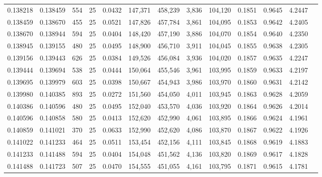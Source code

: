 \begin{tabular}{rrrrrrrrrrrrr}
0.138218 & 0.138459 &   554 &  25 &                                     0.0432 & 147,371 & 458,239 &   3,836 & 104,120 & 0.1851 & 0.9645 & 4.2447 \\
0.138459 & 0.138670 &   455 &  25 &                                     0.0521 & 147,826 & 457,784 &   3,861 & 104,095 & 0.1853 & 0.9642 & 4.2405 \\
0.138670 & 0.138944 &   594 &  25 &                                     0.0404 & 148,420 & 457,190 &   3,886 & 104,070 & 0.1854 & 0.9640 & 4.2350 \\
0.138945 & 0.139155 &   480 &  25 &                                     0.0495 & 148,900 & 456,710 &   3,911 & 104,045 & 0.1855 & 0.9638 & 4.2305 \\
0.139156 & 0.139443 &   626 &  25 &                                     0.0384 & 149,526 & 456,084 &   3,936 & 104,020 & 0.1857 & 0.9635 & 4.2247 \\
0.139444 & 0.139694 &   538 &  25 &                                     0.0444 & 150,064 & 455,546 &   3,961 & 103,995 & 0.1859 & 0.9633 & 4.2197 \\
0.139695 & 0.139979 &   603 &  25 &                                     0.0398 & 150,667 & 454,943 &   3,986 & 103,970 & 0.1860 & 0.9631 & 4.2142 \\
0.139980 & 0.140385 &   893 &  25 &                                     0.0272 & 151,560 & 454,050 &   4,011 & 103,945 & 0.1863 & 0.9628 & 4.2059 \\
0.140386 & 0.140596 &   480 &  25 &                                     0.0495 & 152,040 & 453,570 &   4,036 & 103,920 & 0.1864 & 0.9626 & 4.2014 \\
0.140596 & 0.140858 &   580 &  25 &                                     0.0413 & 152,620 & 452,990 &   4,061 & 103,895 & 0.1866 & 0.9624 & 4.1961 \\
0.140859 & 0.141021 &   370 &  25 &                                     0.0633 & 152,990 & 452,620 &   4,086 & 103,870 & 0.1867 & 0.9622 & 4.1926 \\
0.141022 & 0.141233 &   464 &  25 &                                     0.0511 & 153,454 & 452,156 &   4,111 & 103,845 & 0.1868 & 0.9619 & 4.1883 \\
0.141233 & 0.141488 &   594 &  25 &                                     0.0404 & 154,048 & 451,562 &   4,136 & 103,820 & 0.1869 & 0.9617 & 4.1828 \\
0.141488 & 0.141723 &   507 &  25 &                                     0.0470 & 154,555 & 451,055 &   4,161 & 103,795 & 0.1871 & 0.9615 & 4.1781 \\

\end{tabular}
